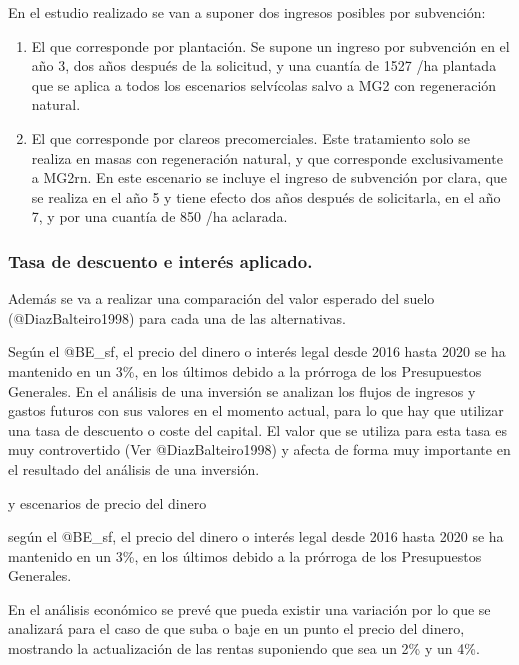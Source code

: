 \documentclass[
]{article}
\begin{document}
En el estudio realizado se van a suponer dos ingresos posibles por
subvención:

\begin{enumerate}
\def\labelenumi{\arabic{enumi}.}
\item
  El que corresponde por plantación. Se supone un ingreso por subvención
  en el año 3, dos años después de la solicitud, y una cuantía de 1527
  /ha plantada que se aplica a todos los escenarios selvícolas salvo a
  MG2 con regeneración natural.
\item
  El que corresponde por clareos precomerciales. Este tratamiento solo
  se realiza en masas con regeneración natural, y que corresponde
  exclusivamente a MG2rn. En este escenario se incluye el ingreso de
  subvención por clara, que se realiza en el año 5 y tiene efecto dos
  años después de solicitarla, en el año 7, y por una cuantía de 850 /ha
  aclarada.
\end{enumerate}

\hypertarget{tasa-de-descuento-e-interuxe9s-aplicado.}{%
\subsubsection{Tasa de descuento e interés
aplicado.}\label{tasa-de-descuento-e-interuxe9s-aplicado.}}

Además se va a realizar una comparación del valor esperado del suelo
(@DiazBalteiro1998) para cada una de las alternativas.

Según el @BE\_sf, el precio del dinero o interés legal desde 2016 hasta
2020 se ha mantenido en un 3\%, en los últimos debido a la prórroga de
los Presupuestos Generales. En el análisis de una inversión se analizan
los flujos de ingresos y gastos futuros con sus valores en el momento
actual, para lo que hay que utilizar una tasa de descuento o coste del
capital. El valor que se utiliza para esta tasa es muy controvertido
(Ver @DiazBalteiro1998) y afecta de forma muy importante en el resultado
del análisis de una inversión.

y escenarios de precio del dinero

según el @BE\_sf, el precio del dinero o interés legal desde 2016 hasta
2020 se ha mantenido en un 3\%, en los últimos debido a la prórroga de
los Presupuestos Generales.

En el análisis económico se prevé que pueda existir una variación por lo
que se analizará para el caso de que suba o baje en un punto el precio
del dinero, mostrando la actualización de las rentas suponiendo que sea
un 2\% y un 4\%.
\end{document}

